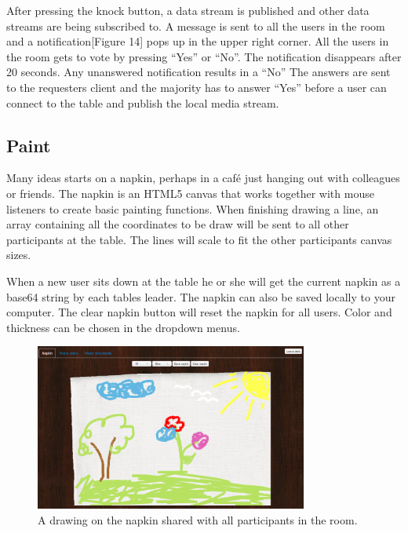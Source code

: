 \documentclass[12pt, titlepage]{article}
\begin{document}
After pressing the knock button, a data stream is published and other data streams are being subscribed to. A message is sent to all the users in the room and a notification[Figure 14] pops up in the upper right corner. All the users in the room gets to vote by pressing “Yes” or “No”. The notification disappears after 20 seconds. Any unanswered notification results in a “No” The answers are sent to the requesters client and the majority has to answer “Yes” before a user can connect to the table and publish the local media stream.

\subsection{Paint}
Many ideas starts on a napkin, perhaps in a café just hanging out with colleagues or friends. The napkin is an HTML5 canvas that works together with mouse listeners to create basic painting functions. When finishing drawing a line, an array containing all the coordinates to be draw will be sent to all other participants at the table. The lines will scale to fit the other participants canvas sizes.

When a new user sits down at the table he or she will get the current napkin as a base64 string by each tables leader. The napkin can also be saved locally to your computer. The clear napkin button will reset the napkin for all users. Color and thickness can be chosen in the dropdown menus.
\begin{figure}[H]
  \centering
	\includegraphics[width=0.8\textwidth,keepaspectratio]{theNapkin.png}
  \caption{A drawing on the napkin shared with all participants in the room.}
\end{figure}
\end{document}
